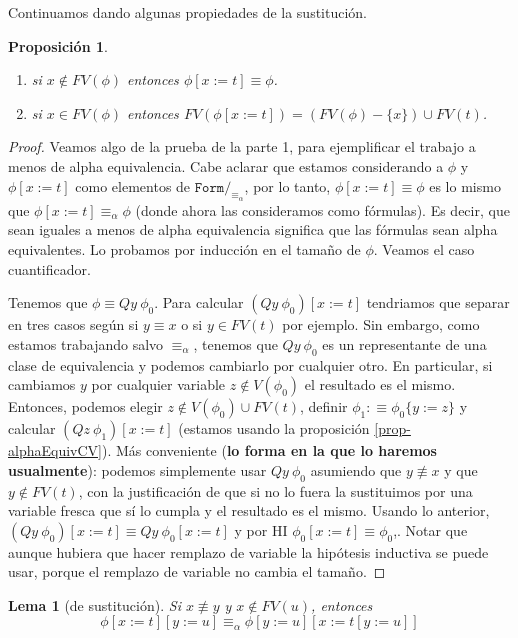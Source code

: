 \documentclass[a4paper, 12pt]{report}
\newtheorem{lema}[teorema]{Lema}
\newtheorem{prop}[teorema]{Proposición}
\theoremstyle{definition}
\begin{document}
Continuamos dando algunas propiedades de la sustitución.
\begin{prop}
	\begin{enumerate}
		\item si $x\not\in FV(\phi)$ entonces $\phi[x:=t]\equiv\phi$.
		\item si $x\in FV(\phi)$ entonces $FV(\phi[x:=t])=(FV(\phi)-\{x\})\cup FV(t)$.
	\end{enumerate}
\end{prop}
\begin{proof}
	Veamos algo de la prueba de la parte 1, para ejemplificar el trabajo a menos de alpha equivalencia. Cabe aclarar que estamos considerando a $\phi$ y $\phi[x:=t]$ como elementos de $\mathtt{Form}/_{\equiv_\alpha}$, por lo tanto, $\phi[x:=t]\equiv\phi$ es lo mismo que $\phi[x:=t]\equiv_\alpha\phi$ (donde ahora las consideramos como fórmulas). Es decir, que sean iguales a menos de alpha equivalencia significa que las fórmulas sean alpha equivalentes. Lo probamos por inducción en el tamaño de $\phi$. Veamos el caso cuantificador.
	
	Tenemos que $\phi\equiv Qy~\phi_0$. Para calcular $(Qy~\phi_0)[x:=t]$ tendriamos que separar en tres casos según si $y\equiv x$ o si $y\in FV(t)$ por ejemplo. Sin embargo, como estamos trabajando salvo $\equiv_\alpha$, tenemos que $Qy~\phi_0$ es un representante de una clase de equivalencia y podemos cambiarlo por cualquier otro. En particular, si cambiamos $y$ por cualquier variable $z\not\in V(\phi_0)$ el resultado es el mismo. Entonces, podemos elegir $z\not\in V(\phi_0)\cup FV(t)$, definir $\phi_1:\equiv\phi_0\{y:=z\}$ y calcular $(Qz~\phi_1)[x:=t]$ (estamos usando la proposición \ref{prop-alphaEquivCV}). Más conveniente (\textbf{lo forma en la que lo haremos usualmente}): podemos simplemente usar $Qy~\phi_0$ asumiendo que $y\not\equiv x$ y que $y\not\in FV(t)$, con la justificación de que si no lo fuera la sustituimos por una variable fresca que sí lo cumpla y el resultado es el mismo. Usando lo anterior, $(Qy~\phi_0)[x:=t]\equiv Qy~\phi_0[x:=t]$ y por HI  $\phi_0[x:=t]\equiv\phi_0$,.  Notar que aunque hubiera que hacer remplazo de variable la hipótesis inductiva se puede usar, porque el remplazo de variable no cambia el tamaño.
\end{proof}
\begin{lema}[de sustitución]
	Si $x\not\equiv y$ y $x\not\in FV(u)$, entonces
	$$\phi[x:=t][y:=u]\equiv_\alpha \phi[y:=u][x:=t[y:=u]]
	$$
\end{lema}
\end{document}
